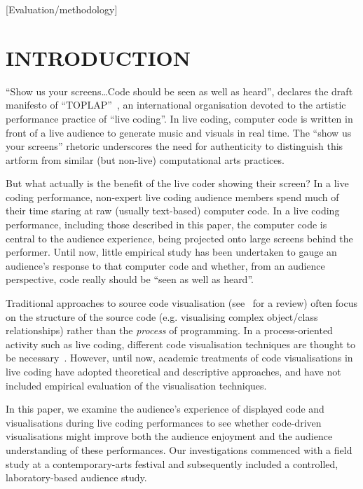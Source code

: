 \documentclass{sig-alternate}
\begin{document}
[Evaluation/methodology]



\enlargethispage{10pt}

\section*{INTRODUCTION}

``Show us your screens\ldots Code should be seen as well as heard'',
declares the draft manifesto of ``TOPLAP''~\citep{Toplap}, an
international organisation devoted to the artistic performance
practice of ``live coding''. In live coding, computer code is written
in front of a live audience to generate music and visuals in real
time. The ``show us your screens'' rhetoric underscores the need for
authenticity to distinguish this artform from similar (but non-live)
computational arts practices.

But what actually is the benefit of the live coder showing their
screen? In a live coding performance, non-expert live coding audience
members spend much of their time staring at raw (usually text-based)
computer code. In a live coding performance, including those described
in this paper, the computer code is central to the audience
experience, being projected onto large screens behind the performer.
Until now, little empirical study has been undertaken to gauge an
audience's response to that computer code and whether, from an
audience perspective, code really should be ``seen as well as heard''.

Traditional approaches to source code visualisation
(see~\citealp{Novais2013} for a review) often focus on the structure of
the source code (e.g. visualising complex object/class relationships)
rather than the \emph{process} of programming. In a process-oriented
activity such as live coding, different code visualisation techniques
are thought to be necessary~\citep{McLean2010a,Magnusson2013}.
However, until now, academic treatments of code visualisations in live
coding have adopted theoretical and descriptive approaches, and have
not included empirical evaluation of the visualisation techniques.

In this paper, we examine the audience's experience of displayed code
and visualisations during live coding performances to see whether
code-driven visualisations might improve both the audience enjoyment
and the audience understanding of these performances. Our
investigations commenced with a field study at a contemporary-arts
festival and subsequently included a controlled, laboratory-based
audience study.
\end{document}
